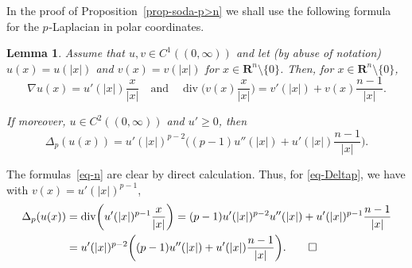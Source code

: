 \documentclass[a4paper, twoside]{article}
\makeatletter
\theoremstyle{propositional}
\newtheorem{lem}[thm]{Lemma}
\theoremstyle{descriptive}
\renewenvironment{proof}[1][\proofname]{\par
  \pushQED{\qed}%
  \normalfont
  \trivlist
  \item[\hskip\labelsep
        \itshape
    #1\@addpunct{.}]\ignorespaces
}{%
  \popQED\endtrivlist\@endpefalse
}
\numberwithin{equation}{section}
\DeclareMathOperator{\Div}{div}
\newcommand{\Rn}{\mathbf{R}^n}
\newcommand{\p}{{$p\mspace{1mu}$}}
\newcommand{\setm}{\setminus}
\makeatother
\begin{document}
In the proof of Proposition~\ref{prop-soda-p>n} we 
shall use the following
formula for the \p-Laplacian in polar coordinates.

\begin{lem} \label{lem-Deltap-polar}
Assume that $u,v \in C^1((0,\infty))$ and 
let\/ {\rm(}by abuse of notation\/{\rm)} 
$u(x)=u(|x|)$ and $v(x)=v(|x|)$ for $x \in\Rn \setm \{0\}$.
Then, for $x \in\Rn \setm \{0\}$,
\begin{equation}  \label{eq-n}
   \nabla u(x) = u'(|x|) \frac{x}{|x|}
\quad \text{and} \quad 
   \Div \biggl(v(x)\frac{x}{|x|}\biggr)  = v'(|x|) + v(x) \frac{n-1}{|x|}.
\end{equation}

If moreover, $u\in C^2((0,\infty))$ and $u' \ge 0$, then
\begin{equation} \label{eq-Deltap}
   \Delta_p(u(x))= u'(|x|)^{p-2} \biggl( (p-1) u''(|x|) + u'(|x|) \frac{n-1}{|x|}\biggr).
\end{equation}
\end{lem}


\begin{proof}
The formulas~\eqref{eq-n} are clear by direct calculation.
Thus, for \eqref{eq-Deltap}, we have with $v(x)= u'(|x|)^{p-1}$,
\begin{align*} 
   \Delta_p(u(x))&
= \Div \biggl(u'(|x|)^{p-1}  \frac{x}{|x|} \biggr) 
 = (p-1) u'(|x|)^{p-2}u''(|x|) + u'(|x|)^{p-1} \frac{n-1}{|x|}\\
&= u'(|x|)^{p-2} \biggl( (p-1) u''(|x|) + u'(|x|) \frac{n-1}{|x|}\biggr).
\qedhere
\end{align*}
\end{proof}
\end{document}
